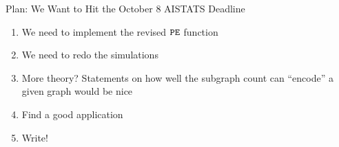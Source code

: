 \documentclass[newPxFont,numfooter,sectionpages]{beamer}
\DeclareMathOperator*{\argmin}{arg\,min}
\newcommand{\E}{\mathbb{E}}
\newcommand{\btheta}{\boldsymbol{\phi}}
\begin{document}
\begin{frame}{Plan: We Want to Hit the October 8 AISTATS Deadline}
\begin{enumerate}
  \item We need to implement the revised $\tt PE$ function
  \item We need to redo the simulations
  \item More theory? Statements on how well the subgraph count can ``encode'' a given graph would be nice
  \item Find a good application
  \item Write!
\end{enumerate}
\end{frame}
\end{document}
